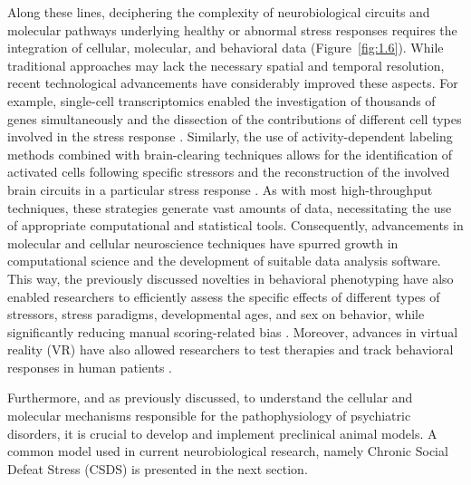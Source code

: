 Along these lines, deciphering the complexity of neurobiological circuits and molecular pathways underlying healthy or abnormal stress responses requires the integration of cellular, molecular, and behavioral data \cite{Miranda2023IncreasingBehaviors} (Figure~\ref{fig:1.6}). While traditional approaches may lack the necessary spatial and temporal resolution, recent technological advancements have considerably improved these aspects. For example, single-cell transcriptomics enabled the investigation of thousands of genes simultaneously and the dissection of the contributions of different cell types involved in the stress response \cite{Lopez2021Single-cellAdaptation}. Similarly, the use of activity-dependent labeling methods combined with brain-clearing techniques allows for the identification of activated cells following specific stressors and the reconstruction of the involved brain circuits in a particular stress response \cite{Li2020ComputationalCentury}. As with most high-throughput techniques, these strategies generate vast amounts of data, necessitating the use of appropriate computational and statistical tools. Consequently, advancements in molecular and cellular neuroscience techniques have spurred growth in computational science and the development of suitable data analysis software. This way, the previously discussed novelties in behavioral phenotyping have also enabled researchers to efficiently assess the specific effects of different types of stressors, stress paradigms, developmental ages, and sex on behavior, while significantly reducing manual scoring-related bias \cite{Shemesh2023ANeuroethology}. Moreover, advances in virtual reality (VR) have also allowed researchers to test therapies and track behavioral responses in human patients \cite{Binder2020QuantifyingReality, Binder2022FacingPhobia}.

Furthermore, and as previously discussed, to understand the cellular and molecular mechanisms responsible for the pathophysiology of psychiatric disorders, it is crucial to develop and implement preclinical animal models. A common model used in current neurobiological research, namely Chronic Social Defeat Stress (CSDS) is presented in the next section.

